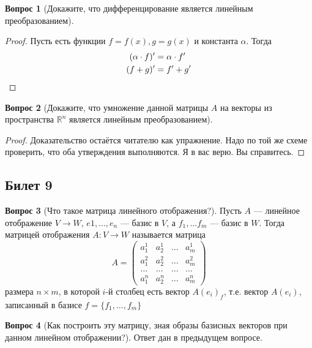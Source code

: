 \documentclass[a4paper,11pt]{article}
\theoremstyle{remark}
\theoremstyle{definition}
\newtheorem{question}{Вопрос}
\numberwithin{question}{subsection}
\begin{document}
\begin{question}[Докажите, что дифференцирование является линейным преобразованием]\(\)
\begin{proof}
Пусть есть функции \(f = f(x), g = g(x)\) и константа \(\alpha\). Тогда
\begin{align*}
	(\alpha \cdot f)' &= \alpha \cdot f' \\
	(f + g)' &= f' + g' \qedhere
\end{align*}
\end{proof}
\end{question}


\begin{question}[Докажите, что умножение данной матрицы \(A\) на векторы из пространства \(\mathbb{R}^n\) является линейным преобразованием]\(\)
\begin{proof}
Доказательство остаётся читателю как упражнение. Надо по той же схеме проверить, что оба утверждения выполняются. Я в вас верю. Вы справитесь. 
\end{proof}
\end{question}


\subsection{Билет 9}
\begin{question}[Что такое матрица линейного отображения?]
Пусть \(A\) --- линейное отображение \(V \rightarrow W\), \(e1, \dots, e_n\) --- базис в \(V\), а \(f_1, \dots f_m\) --- базис в \(W\). Тогда матрицей отображения \(A: V \rightarrow W\) называется матрица
\begin{equation*}
	A = 
	\begin{pmatrix}
		a^1_1 & a^1_2 & \dots & a^1_m \\
		a^2_1 & a^2_2 & \dots & a^2_m \\
		\dots & \dots & \dots & \dots \\
		a^n_1 & a^n_2 & \dots & a^n_m
	\end{pmatrix}
\end{equation*}
размера \(n \times m\), в которой \(i\)-й столбец есть вектор \(A(e_i)_f\), т.е. вектор \(A(e_i)\), записанный в базисе \(f = \{f_1, ..., f_m\}\) 
\end{question}

\begin{question}[Как построить эту матрицу, зная образы базисных векторов при данном линейном отображении?]
Ответ дан в предыдущем вопросе.
\end{question}
\end{document}
